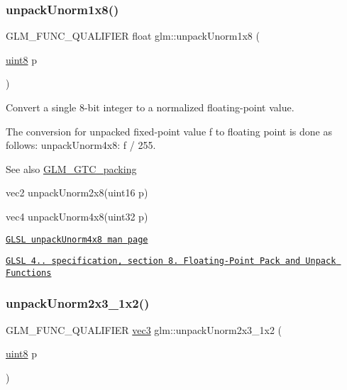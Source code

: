 \subsubsection{\texorpdfstring{unpack\+Unorm1x8()}{unpackUnorm1x8()}}
{\footnotesize\ttfamily G\+L\+M\+\_\+\+F\+U\+N\+C\+\_\+\+Q\+U\+A\+L\+I\+F\+I\+ER float glm\+::unpack\+Unorm1x8 (\begin{DoxyParamCaption}\item[{\hyperlink{group__gtc__type__precision_ga1a7dcd8aac97cc8020817c94049deff2}{uint8}}]{p }\end{DoxyParamCaption})}

Convert a single 8-\/bit integer to a normalized floating-\/point value.

The conversion for unpacked fixed-\/point value f to floating point is done as follows\+: unpack\+Unorm4x8\+: f / 255.

\begin{DoxySeeAlso}{See also}
\hyperlink{group__gtc__packing}{G\+L\+M\+\_\+\+G\+T\+C\+\_\+packing} 

vec2 unpack\+Unorm2x8(uint16 p) 

vec4 unpack\+Unorm4x8(uint32 p) 

\href{http://www.opengl.org/sdk/docs/manglsl/xhtml/unpackUnorm4x8.xml}{\tt G\+L\+SL unpack\+Unorm4x8 man page} 

\href{http://www.opengl.org/registry/doc/GLSLangSpec.4.20.8.pdf}{\tt G\+L\+SL 4.. specification, section 8. Floating-\/\+Point Pack and Unpack Functions} 
\end{DoxySeeAlso}
\mbox{\label{group__gtc__packing_gaeeacc5275329100c50fe8fc0871eb423}} 
\subsubsection{\texorpdfstring{unpack\+Unorm2x3\+\_\+1x2()}{unpackUnorm2x3\_1x2()}}
{\footnotesize\ttfamily G\+L\+M\+\_\+\+F\+U\+N\+C\+\_\+\+Q\+U\+A\+L\+I\+F\+I\+ER \hyperlink{group__core__types_ga1c47e8b3386109bc992b6c48e91b0be7}{vec3} glm\+::unpack\+Unorm2x3\+\_\+1x2 (\begin{DoxyParamCaption}\item[{\hyperlink{group__gtc__type__precision_ga1a7dcd8aac97cc8020817c94049deff2}{uint8}}]{p }\end{DoxyParamCaption})}

